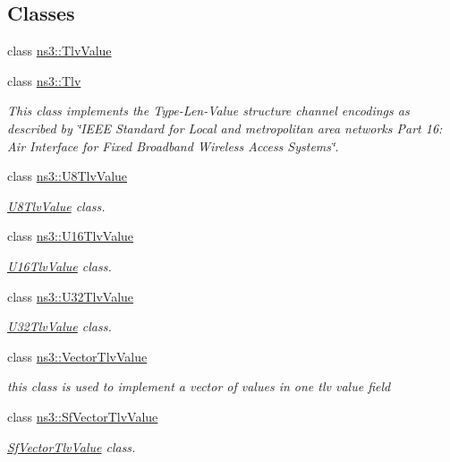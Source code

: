 \subsection*{Classes}
\begin{DoxyCompactItemize}
\item 
class \hyperlink{classns3_1_1TlvValue}{ns3\+::\+Tlv\+Value}
\item 
class \hyperlink{classns3_1_1Tlv}{ns3\+::\+Tlv}
\begin{DoxyCompactList}\small\item\em This class implements the Type-\/\+Len-\/\+Value structure channel encodings as described by \char`\"{}\+I\+E\+E\+E Standard for
\+Local and metropolitan area networks Part 16\+: Air Interface for Fixed Broadband Wireless Access Systems\char`\"{}. \end{DoxyCompactList}\item 
class \hyperlink{classns3_1_1U8TlvValue}{ns3\+::\+U8\+Tlv\+Value}
\begin{DoxyCompactList}\small\item\em \hyperlink{classns3_1_1U8TlvValue}{U8\+Tlv\+Value} class. \end{DoxyCompactList}\item 
class \hyperlink{classns3_1_1U16TlvValue}{ns3\+::\+U16\+Tlv\+Value}
\begin{DoxyCompactList}\small\item\em \hyperlink{classns3_1_1U16TlvValue}{U16\+Tlv\+Value} class. \end{DoxyCompactList}\item 
class \hyperlink{classns3_1_1U32TlvValue}{ns3\+::\+U32\+Tlv\+Value}
\begin{DoxyCompactList}\small\item\em \hyperlink{classns3_1_1U32TlvValue}{U32\+Tlv\+Value} class. \end{DoxyCompactList}\item 
class \hyperlink{classns3_1_1VectorTlvValue}{ns3\+::\+Vector\+Tlv\+Value}
\begin{DoxyCompactList}\small\item\em this class is used to implement a vector of values in one tlv value field \end{DoxyCompactList}\item 
class \hyperlink{classns3_1_1SfVectorTlvValue}{ns3\+::\+Sf\+Vector\+Tlv\+Value}
\begin{DoxyCompactList}\small\item\em \hyperlink{classns3_1_1SfVectorTlvValue}{Sf\+Vector\+Tlv\+Value} class. \end{DoxyCompactList}\item 

\end{DoxyCompactItemize}
